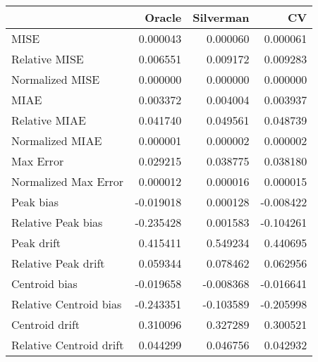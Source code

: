 \begin{tabular}{lrrr}
  \hline
 & Oracle & Silverman & CV \\ 
  \hline
MISE & 0.000043 & 0.000060 & 0.000061 \\ 
  Relative MISE & 0.006551 & 0.009172 & 0.009283 \\ 
  Normalized MISE & 0.000000 & 0.000000 & 0.000000 \\ 
  MIAE & 0.003372 & 0.004004 & 0.003937 \\ 
  Relative MIAE & 0.041740 & 0.049561 & 0.048739 \\ 
  Normalized MIAE & 0.000001 & 0.000002 & 0.000002 \\ 
  Max Error & 0.029215 & 0.038775 & 0.038180 \\ 
  Normalized Max Error & 0.000012 & 0.000016 & 0.000015 \\ 
  Peak bias & -0.019018 & 0.000128 & -0.008422 \\ 
  Relative Peak bias & -0.235428 & 0.001583 & -0.104261 \\ 
  Peak drift & 0.415411 & 0.549234 & 0.440695 \\ 
  Relative Peak drift & 0.059344 & 0.078462 & 0.062956 \\ 
  Centroid bias & -0.019658 & -0.008368 & -0.016641 \\ 
  Relative Centroid bias & -0.243351 & -0.103589 & -0.205998 \\ 
  Centroid drift & 0.310096 & 0.327289 & 0.300521 \\ 
  Relative Centroid drift & 0.044299 & 0.046756 & 0.042932 \\ 
   \hline
\end{tabular}
